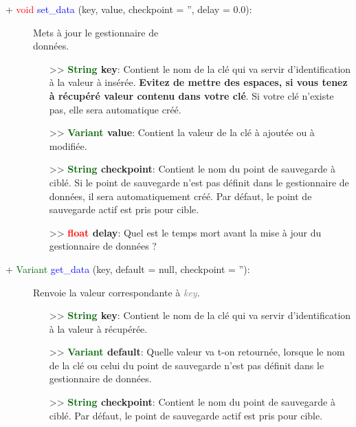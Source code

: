 \documentclass[a4paper, 11pt]{article}
\begin{document}
	\begin{description}
		\item [+ \textcolor{red}{void} \textcolor{blue}{set\_data} (key, value, checkpoint = '', delay = 
		0.0):] Mets à jour le gestionnaire de \\données.
		\begin{itemize}
			\item [>> \textbf{\textcolor{darkgreen}{String} key}:] Contient le nom de la clé qui va servir
			d'identification à la valeur à insérée. \textbf{Evitez de mettre des espaces, si vous tenez à
			récupéré valeur contenu dans votre clé}. Si votre clé n'existe pas, elle sera automatique créé.
			\item [>> \textbf{\textcolor{darkgreen}{Variant} value}:] Contient la valeur de la clé à
			ajoutée ou à modifiée.
			\item [>> \textbf{\textcolor{darkgreen}{String} checkpoint}:] Contient le nom du point de
			sauvegarde à ciblé. Si le point de sauvegarde n'est pas définit dans le gestionnaire de données, 
			il sera automatiquement créé. Par défaut, le point de sauvegarde actif est pris pour cible.
			\item [>> \textbf{\textcolor{red}{float} delay}:] Quel est le temps mort avant la mise à jour du
			gestionnaire de données ?\\
		\end{itemize}
	\end{description}
	\begin{description}
		\item [+ \textcolor{darkgreen}{Variant} \textcolor{blue}{get\_data} (key, default = null, checkpoint
		= ''):] Renvoie la valeur correspondante à \textit{\textcolor{gray}{key}}.
		\begin{itemize}
			\item [>> \textbf{\textcolor{darkgreen}{String} key}:] Contient le nom de la clé qui va servir
			d'identification à la valeur à récupérée.
			\item [>> \textbf{\textcolor{darkgreen}{Variant} default}:] Quelle valeur va t-on retournée,
			lorsque le nom de la clé ou celui du point de sauvegarde n'est pas définit dans le gestionnaire 
			de données.
			\item [>> \textbf{\textcolor{darkgreen}{String} checkpoint}:] Contient le nom du point de
			sauvegarde à ciblé. Par défaut, le point de sauvegarde actif est pris pour cible.\\
		\end{itemize}
	\end{description}
\end{document}
